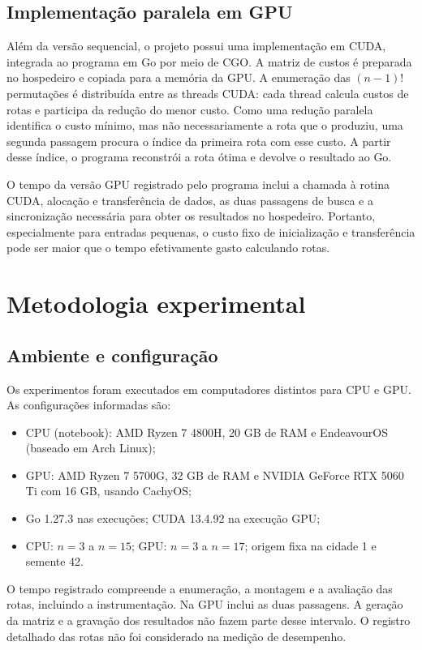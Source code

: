 \documentclass[12pt,a4paper]{article}
\begin{document}
\subsection{Implementação paralela em GPU}

Além da versão sequencial, o projeto possui uma implementação em CUDA, integrada ao programa em Go por meio de CGO. A matriz de custos é preparada no hospedeiro e copiada para a memória da GPU. A enumeração das $(n-1)!$ permutações é distribuída entre as threads CUDA: cada thread calcula custos de rotas e participa da redução do menor custo. Como uma redução paralela identifica o custo mínimo, mas não necessariamente a rota que o produziu, uma segunda passagem procura o índice da primeira rota com esse custo. A partir desse índice, o programa reconstrói a rota ótima e devolve o resultado ao Go.

O tempo da versão GPU registrado pelo programa inclui a chamada à rotina CUDA, alocação e transferência de dados, as duas passagens de busca e a sincronização necessária para obter os resultados no hospedeiro. Portanto, especialmente para entradas pequenas, o custo fixo de inicialização e transferência pode ser maior que o tempo efetivamente gasto calculando rotas.

\section{Metodologia experimental}

\subsection{Ambiente e configuração}

Os experimentos foram executados em computadores distintos para CPU e GPU. As configurações informadas são:
\begin{itemize}
    \item CPU (notebook): AMD Ryzen 7 4800H, 20 GB de RAM e EndeavourOS (baseado em Arch Linux);
    \item GPU: AMD Ryzen 7 5700G, 32 GB de RAM e NVIDIA GeForce RTX 5060 Ti com 16 GB, usando CachyOS;
    \item Go 1.27.3 nas execuções; CUDA 13.4.92 na execução GPU;
    \item CPU: $n=3$ a $n=15$; GPU: $n=3$ a $n=17$; origem fixa na cidade 1 e semente 42.
\end{itemize}

O tempo registrado compreende a enumeração, a montagem e a avaliação das rotas, incluindo a instrumentação. Na GPU inclui as duas passagens. A geração da matriz e a gravação dos resultados não fazem parte desse intervalo. O registro detalhado das rotas não foi considerado na medição de desempenho.
\end{document}
